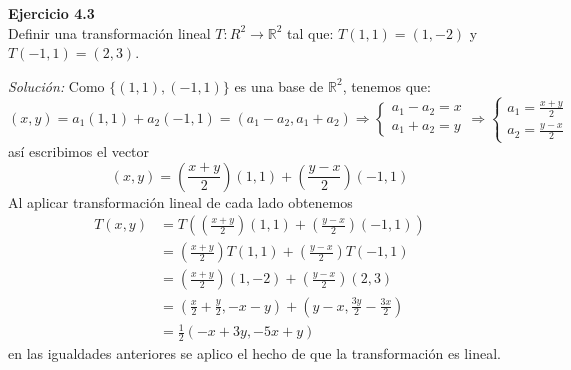 \documentclass{article}
\newenvironment{problem}[2][Ejercicio]
    { \begin{mdframed}[backgroundcolor=gray!20] \textbf{#1 #2} \\}
    {  \end{mdframed}}
\newenvironment{solution}
    {\textit{Solución:}}
    {}
\begin{document}
\begin{problem}{4.3}
    Definir una transformación lineal $T : R^2 \to \mathbb{R}^2$ tal que: $T(1, 1) = (1, -2)$ y $T(-1, 1) = (2, 3)$.
\end{problem}
\begin{solution}
    Como $\{ (1,1), (-1,1) \}$ es una base de $\mathbb{R}^2$, tenemos que:
\[
(x,y) = a_1(1,1)+a_2(-1,1)= (a_1-a_2, a_1+a_2) \Rightarrow \begin{cases}
a_1-a_2 = x \\
a_1+a_2 = y
\end{cases} \Rightarrow
\begin{cases}
a_1= \frac{x+y}{2} \\
a_2 = \frac{y-x}{2}
\end{cases}
\]
así escribimos el vector
\[
(x,y) = \left ( \frac{x+y}{2} \right ) (1,1) + \left ( \frac{y-x}{2} \right )(-1,1)
\]
Al aplicar transformación lineal de cada lado obtenemos
\[
\begin{aligned}
T(x,y) &= T\left( \left ( \frac{x+y}{2} \right ) (1,1) + \left ( \frac{y-x}{2} \right )(-1,1) \right) \\
&= \left ( \frac{x+y}{2} \right ) T(1,1) + \left ( \frac{y-x}{2} \right ) T(-1,1) \\
&= \left ( \frac{x+y}{2} \right ) (1,-2) + \left ( \frac{y-x}{2} \right ) (2,3) \\
&= \left( \frac{x}{2}+\frac{y}{2}, -x-y \right ) + \left ( y-x, \frac{3y}{2}-\frac{3x}{2} \right ) \\
&= \frac{1}{2} \left( -x+3y, -5x+y \right)
\end{aligned}
\]
en las igualdades anteriores se aplico el hecho de que la transformación es lineal.
\end{solution}
\end{document}
